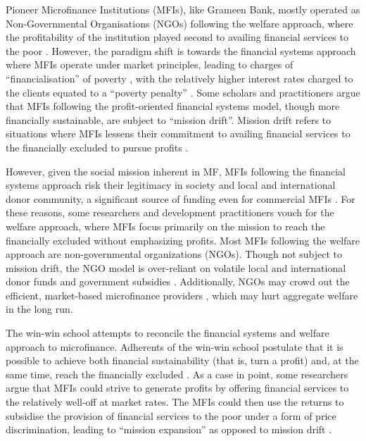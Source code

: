 \documentclass[a4paper, nobind]{templates/ociamthesis}
\begin{document}
Pioneer Microfinance Institutions (MFIs), like Grameen Bank, mostly operated as Non-Governmental Organisations (NGOs) following the welfare approach, where the profitability of the institution played second to availing financial services to the poor \autocite{chahine2010social,d2017ngos}. However, the paradigm shift is towards the financial systems approach where MFIs operate under market principles, leading to charges of ``financialisation'' of poverty \autocite{mader2015financialization}, with the relatively higher interest rates charged to the clients equated to a ``poverty penalty'' \autocite{chen2017microfinance}. Some scholars and practitioners argue that MFIs following the profit-oriented financial systems model, though more financially sustainable, are subject to ``mission drift''. Mission drift refers to situations where MFIs lessens their commitment to availing financial services to the financially excluded to pursue profits \autocite{jia2016commercialization,mia2017mission}.

However, given the social mission inherent in MF, MFIs following the financial systems approach risk their legitimacy in society and local and international donor community, a significant source of funding even for commercial MFIs \autocite{nason2018behavioral}. For these reasons, some researchers and development practitioners vouch for the welfare approach, where MFIs focus primarily on the mission to reach the financially excluded without emphasizing profits. Most MFIs following the welfare approach are non-governmental organizations (NGOs). Though not subject to mission drift, the NGO model is over-reliant on volatile local and international donor funds and government subsidies \autocite{garmaise2013cheap,d2017aid}. Additionally, NGOs may crowd out the efficient, market-based microfinance providers \autocite{kota2007}, which may hurt aggregate welfare in the long run.

The win-win school attempts to reconcile the financial systems and welfare approach to microfinance. Adherents of the win-win school postulate that it is possible to achieve both financial sustainability (that is, turn a profit) and, at the same time, reach the financially excluded \autocite{kodongo2013individual}. As a case in point, some researchers argue that MFIs could strive to generate profits by offering financial services to the relatively well-off at market rates. The MFIs could then use the returns to subsidise the provision of financial services to the poor under a form of price discrimination, leading to ``mission expansion'' as opposed to mission drift \autocite{mersland2010microfinance}.
\end{document}
